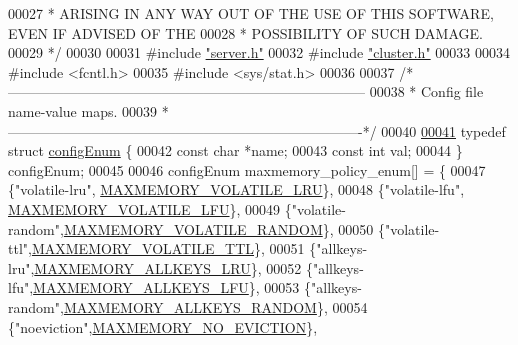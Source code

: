 \begin{DoxyCode}
00027 \textcolor{comment}{ * ARISING IN ANY WAY OUT OF THE USE OF THIS SOFTWARE, EVEN IF ADVISED OF THE}
00028 \textcolor{comment}{ * POSSIBILITY OF SUCH DAMAGE.}
00029 \textcolor{comment}{ */}
00030 
00031 \textcolor{preprocessor}{#}\textcolor{preprocessor}{include} \hyperlink{server_8h}{"server.h"}
00032 \textcolor{preprocessor}{#}\textcolor{preprocessor}{include} \hyperlink{cluster_8h}{"cluster.h"}
00033 
00034 \textcolor{preprocessor}{#}\textcolor{preprocessor}{include} \textcolor{preprocessor}{<}\textcolor{preprocessor}{fcntl}\textcolor{preprocessor}{.}\textcolor{preprocessor}{h}\textcolor{preprocessor}{>}
00035 \textcolor{preprocessor}{#}\textcolor{preprocessor}{include} \textcolor{preprocessor}{<}\textcolor{preprocessor}{sys}\textcolor{preprocessor}{/}\textcolor{preprocessor}{stat}\textcolor{preprocessor}{.}\textcolor{preprocessor}{h}\textcolor{preprocessor}{>}
00036 
00037 \textcolor{comment}{/*-----------------------------------------------------------------------------}
00038 \textcolor{comment}{ * Config file name-value maps.}
00039 \textcolor{comment}{ *----------------------------------------------------------------------------*/}
00040 
\hyperlink{structconfigEnum}{00041} \textcolor{keyword}{typedef} \textcolor{keyword}{struct} \hyperlink{structconfigEnum}{configEnum} \{
00042     \textcolor{keyword}{const} \textcolor{keywordtype}{char} *name;
00043     \textcolor{keyword}{const} \textcolor{keywordtype}{int} val;
00044 \} configEnum;
00045 
00046 configEnum maxmemory\_policy\_enum[] = \{
00047     \{\textcolor{stringliteral}{"volatile-lru"}, \hyperlink{server_8h_a21d27e73cad2234340c026f1fa58c4f9}{MAXMEMORY\_VOLATILE\_LRU}\},
00048     \{\textcolor{stringliteral}{"volatile-lfu"}, \hyperlink{server_8h_ac909ffc67308cb846c08431aa91aa513}{MAXMEMORY\_VOLATILE\_LFU}\},
00049     \{\textcolor{stringliteral}{"volatile-random"},\hyperlink{server_8h_a87a1f8341c97c33069827b359302a1c4}{MAXMEMORY\_VOLATILE\_RANDOM}\},
00050     \{\textcolor{stringliteral}{"volatile-ttl"},\hyperlink{server_8h_a463db85c87bf7ecf91e3f9d182397969}{MAXMEMORY\_VOLATILE\_TTL}\},
00051     \{\textcolor{stringliteral}{"allkeys-lru"},\hyperlink{server_8h_af15f1d0b6d6330f44d42f34ba2faf2d9}{MAXMEMORY\_ALLKEYS\_LRU}\},
00052     \{\textcolor{stringliteral}{"allkeys-lfu"},\hyperlink{server_8h_ac92818fe68a9928917cfa26d5c816f06}{MAXMEMORY\_ALLKEYS\_LFU}\},
00053     \{\textcolor{stringliteral}{"allkeys-random"},\hyperlink{server_8h_adcde0cca14eeb32039c92a26c4672961}{MAXMEMORY\_ALLKEYS\_RANDOM}\},
00054     \{\textcolor{stringliteral}{"noeviction"},\hyperlink{server_8h_a418e5a222cf659c003df77830f1ae343}{MAXMEMORY\_NO\_EVICTION}\},

\end{DoxyCode}
